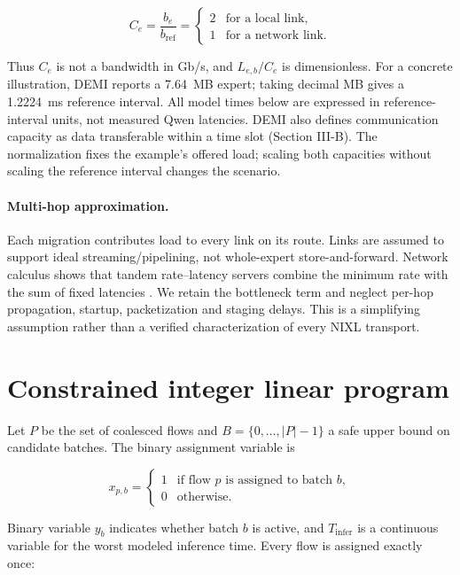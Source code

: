 \begin{equation}
 C_e=\frac{b_e}{b_{\mathrm{ref}}}=
 \begin{cases}
 2 & \text{for a local link},\\
 1 & \text{for a network link}.
 \end{cases}
\end{equation}

Thus $C_e$ is not a bandwidth in Gb/s, and $L_{e,b}/C_e$ is dimensionless.
For a concrete illustration, DEMI reports a 7.64~MB expert; taking decimal MB
gives a 1.2224~ms reference interval. All model times below are expressed in
reference-interval units, not measured Qwen latencies. DEMI also defines
communication capacity as data transferable within a time slot (Section III-B).
The normalization fixes the example's offered load; scaling both capacities
without scaling the reference interval changes the scenario.

\paragraph{Multi-hop approximation.}
Each migration contributes load to every link on its route. Links are assumed
to support ideal streaming/pipelining, not whole-expert store-and-forward.
Network calculus shows that tandem rate--latency servers combine the minimum
rate with the sum of fixed latencies \cite[Theorem~1.4.6]{leboudec2001networkcalculus}.
We retain the bottleneck term and neglect per-hop propagation, startup,
packetization and staging delays. This is a simplifying assumption rather than
a verified characterization of every NIXL transport.

\section{Constrained integer linear program}

Let $P$ be the set of coalesced flows and $B=\{0,\ldots,|P|-1\}$ a safe upper
bound on candidate batches. The binary assignment variable is

\begin{equation}
x_{p,b}=\begin{cases}
1 & \text{if flow $p$ is assigned to batch $b$},\\
0 & \text{otherwise.}
\end{cases}
\end{equation}

Binary variable $y_b$ indicates whether batch $b$ is active, and
$T_{\mathrm{infer}}$ is a continuous variable for the worst modeled inference
time. Every flow is assigned exactly once:

